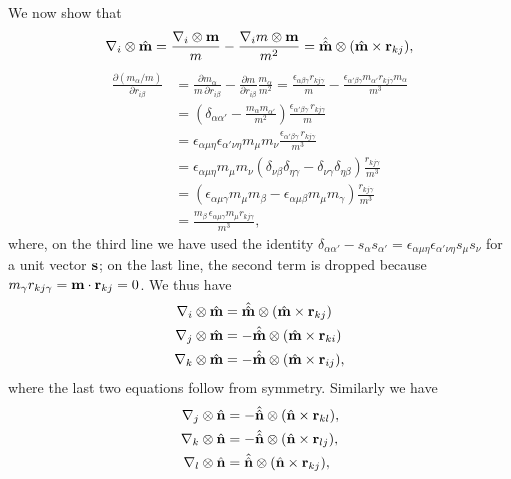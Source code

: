 \documentclass{article}
\begin{document}
We now show that
\begin{equation*}
\nabla_i \otimes \hat{\mathbf{m}}
= \frac{ \nabla_i \otimes \mathbf{m}   } {m}
- \frac{ \nabla_i m \otimes \mathbf{m} } {m^2}
= \hat{\hat{\mathbf{m}}} \otimes (\hat{\mathbf{m}} \times \mathbf{r}_{kj}),
\end{equation*}
%
\begin{equation*}
\begin{split}
  \frac {\partial (m_{\alpha} / m)} {\partial r_{i \beta} }
  &=
  \frac {\partial m_{\alpha}} {m \, \partial r_{i \beta} }
  -
  \frac {\partial m} {\partial r_{i \beta}}
  \frac {m_\alpha} {m^2}
  =
  \frac{ \epsilon_{\alpha \beta \gamma} r_{kj \gamma} } { m }
  - \frac{ \epsilon_{\alpha' \beta \gamma} m_{\alpha'} r_{k j \gamma} m_\alpha }
    { m^3 } \\
  &=
  \left(
       \delta_{\alpha \alpha'}
       - \frac{ m_\alpha m_{\alpha'} }{ m^2 }
  \right)
  \frac{\epsilon_{\alpha' \beta \gamma} \, r_{kj \gamma} } {m} \\
  &=
   \epsilon_{\alpha \mu \eta} \epsilon_{\alpha' \nu \eta}
   m_\mu m_\nu
  \frac{\epsilon_{\alpha' \beta \gamma} \, r_{kj \gamma} } {m^3} \\
  &=
  \epsilon_{\alpha \mu \eta}   m_\mu m_\nu
  (\delta_{\nu \beta} \delta_{\eta \gamma} -
   \delta_{\nu \gamma} \delta_{\eta \beta})
  \frac{ r_{kj \gamma} } {m^3} \\
  &=
  (\epsilon_{\alpha \mu \gamma}   m_\mu m_\beta  -
   \epsilon_{\alpha \mu \beta}   m_\mu m_\gamma )
  \frac{ r_{kj \gamma} } {m^3} \\
  &=
  \frac{m_\beta \, \epsilon_{\alpha \mu \gamma}  m_\mu  r_{kj \gamma}} {m^3},
\end{split}
\end{equation*}
%
where, on the third line we have used the identity
$ \delta_{\alpha \alpha'} - s_\alpha s_{\alpha'}
 = \epsilon_{\alpha \mu \eta} \epsilon_{\alpha' \nu \eta} s_\mu s_\nu $
for a unit vector $\mathbf{s}$;
%
on the last line, the second term is dropped because
$m_\gamma r_{kj \gamma}  = \mathbf{m} \cdot \mathbf{r}_{kj} = 0$.
%
%
%
We thus have
%
\begin{equation}
\begin{split}
\nabla_i \otimes \hat{\mathbf{m}}   &=  \hat{\hat{\mathbf{m}}} \otimes (\hat{\mathbf{m}} \times \mathbf{r}_{kj}) \\
\nabla_j \otimes \hat{\mathbf{m}}   &=  -\hat{\hat{\mathbf{m}}} \otimes (\hat{\mathbf{m}} \times \mathbf{r}_{ki}) \\
\nabla_k \otimes \hat{\mathbf{m}}   &=  -\hat{\hat{\mathbf{m}}} \otimes (\hat{\mathbf{m}} \times \mathbf{r}_{ij}),
\end{split}
\label{eq:dim1}
\end{equation}
where the last two equations follow from symmetry.  Similarly we have
%
%
\begin{equation}
\begin{split}
\nabla_j \otimes \hat{\mathbf{n}}   &=  -\hat{\hat{\mathbf{n}}} \otimes (\hat{\mathbf{n}} \times \mathbf{r}_{kl}), \\
\nabla_k \otimes \hat{\mathbf{n}}   &=  -\hat{\hat{\mathbf{n}}} \otimes (\hat{\mathbf{n}} \times \mathbf{r}_{lj}), \\
\nabla_l \otimes \hat{\mathbf{n}}   &=   \hat{\hat{\mathbf{n}}} \otimes (\hat{\mathbf{n}} \times \mathbf{r}_{kj}),
\end{split}
\end{equation}
\end{document}
